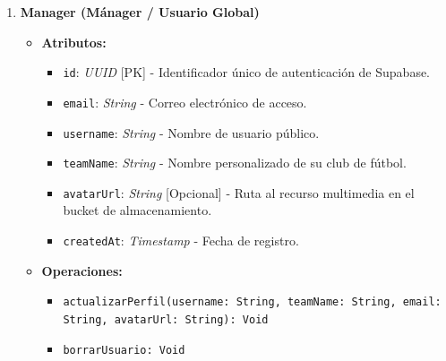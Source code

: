 \begin{enumerate}
    \item \textbf{Manager (Mánager / Usuario Global)}
    \begin{itemize}
        \item \textbf{Atributos:}
            \begin{itemize}
                \item \texttt{id}: \textit{UUID} [PK] - Identificador único de autenticación de Supabase.
                \item \texttt{email}: \textit{String} - Correo electrónico de acceso.
                \item \texttt{username}: \textit{String} - Nombre de usuario público.
                \item \texttt{teamName}: \textit{String} - Nombre personalizado de su club de fútbol.
                \item \texttt{avatarUrl}: \textit{String} [Opcional] - Ruta al recurso multimedia en el bucket de almacenamiento.
                \item \texttt{createdAt}: \textit{Timestamp} - Fecha de registro.
            \end{itemize}
        \item \textbf{Operaciones:}
            \begin{itemize}
                \item \texttt{actualizarPerfil(username: String, teamName: String, email: String, avatarUrl: String): Void}
                \item \texttt{borrarUsuario: Void}
            \end{itemize}
    \end{itemize}


\end{enumerate}
